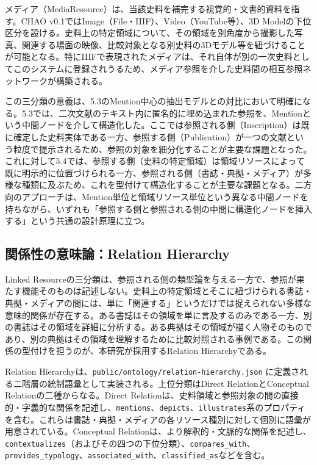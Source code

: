 メディア（MediaResource）は、当該史料を補完する視覚的・文書的資料を指す。CHAO v0.1ではImage（File・IIIF）、Video（YouTube等）、3D Modelの下位区分を設ける。史料上の特定領域について、その領域を別角度から撮影した写真、関連する場面の映像、比較対象となる別史料の3Dモデル等を紐づけることが可能となる。特にIIIFで表現されたメディアは、それ自体が別の一次史料としてこのシステムに登録されうるため、メディア参照を介した史料間の相互参照ネットワークが構築される。

この三分類の意義は、5.3のMention中心の抽出モデルとの対比において明確になる。5.3では、二次文献のテキスト内に匿名的に埋め込まれた参照を、Mentionという中間ノードを介して構造化した。ここでは参照される側（Inscription）は既に確定した史料実体である一方、参照する側（Publication）が一つの文献という粒度で提示されるため、参照の対象を細分化することが主要な課題となった。これに対して5.4では、参照する側（史料の特定領域）は領域リソースによって既に明示的に位置づけられる一方、参照される側（書誌・典拠・メディア）が多様な種類に及ぶため、これを型付けて構造化することが主要な課題となる。二方向のアプローチは、Mention単位と領域リソース単位という異なる中間ノードを持ちながら、いずれも「参照する側と参照される側の中間に構造化ノードを挿入する」という共通の設計原理に立つ。

\subsection{関係性の意味論：Relation Hierarchy}

Linked Resourceの三分類は、参照される側の類型論を与える一方で、参照が果たす機能そのものは記述しない。史料上の特定領域とそこに紐づけられる書誌・典拠・メディアの間には、単に「関連する」というだけでは捉えられない多様な意味的関係が存在する。ある書誌はその領域を単に言及するのみである一方、別の書誌はその領域を詳細に分析する。ある典拠はその領域が描く人物そのものであり、別の典拠はその領域を理解するために比較対照される事例である。この関係の型付けを担うのが、本研究が採用するRelation Hierarchyである。

Relation Hierarchyは、\texttt{public/ontology/relation-hierarchy.json} に定義される二階層の統制語彙として実装される。上位分類はDirect RelationとConceptual Relationの二種からなる。Direct Relationは、史料領域と参照対象の間の直接的・字義的な関係を記述し、\texttt{mentions}、\texttt{depicts}、\texttt{illustrates}系のプロパティを含む。これらは書誌・典拠・メディアの各リソース種別に対して個別に語彙が用意されている。Conceptual Relationは、より解釈的・文脈的な関係を記述し、\texttt{contextualizes}（およびその四つの下位分類）、\texttt{compares\_with}、\texttt{provides\_typology}、\texttt{associated\_with}、\texttt{classified\_as}などを含む。

